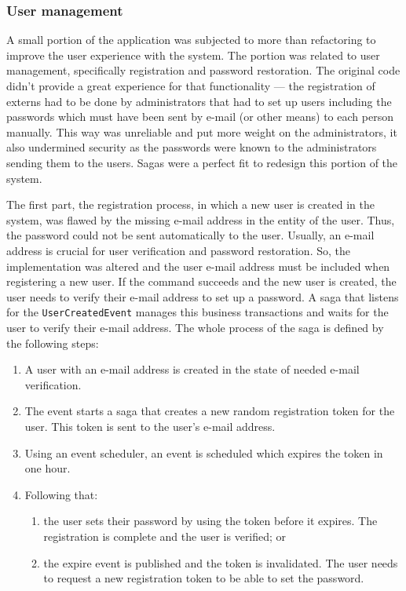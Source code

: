 \documentclass{book}
\begin{document}
\subsubsection{User management}\label{user-management}

A small portion of the application was subjected to more than
refactoring to improve the user experience with the system. The portion
was related to user management, specifically registration and password
restoration. The original code didn't provide a great experience for
that functionality --- the registration of externs had to be done by
administrators that had to set up users including the passwords which
must have been sent by e-mail (or other means) to each person manually.
This way was unreliable and put more weight on the administrators, it
also undermined security as the passwords were known to the
administrators sending them to the users. Sagas were a perfect fit to
redesign this portion of the system.

The first part, the registration process, in which a new user is created
in the system, was flawed by the missing e-mail address in the entity of
the user. Thus, the password could not be sent automatically to the
user. Usually, an e-mail address is crucial for user verification and
password restoration. So, the implementation was altered and the user
e-mail address must be included when registering a new user. If the
command succeeds and the new user is created, the user needs to verify
their e-mail address to set up a password. A saga that listens for the
\texttt{UserCreatedEvent} manages this business transactions and waits
for the user to verify their e-mail address. The whole process of the
saga is defined by the following steps:

\begin{enumerate}
\def\labelenumi{\arabic{enumi}.}
\tightlist
\item
  A user with an e-mail address is created in the state of needed e-mail
  verification.
\item
  The event starts a saga that creates a new random registration token
  for the user. This token is sent to the user's e-mail address.
\item
  Using an event scheduler, an event is scheduled which expires the
  token in one hour.
\item
  Following that:

  \begin{enumerate}
  \def\labelenumii{\alph{enumii})}
  \tightlist
  \item
    the user sets their password by using the token before it expires.
    The registration is complete and the user is verified; or
  \item
    the expire event is published and the token is invalidated. The user
    needs to request a new registration token to be able to set the
    password.
  \end{enumerate}
\end{enumerate}
\end{document}
